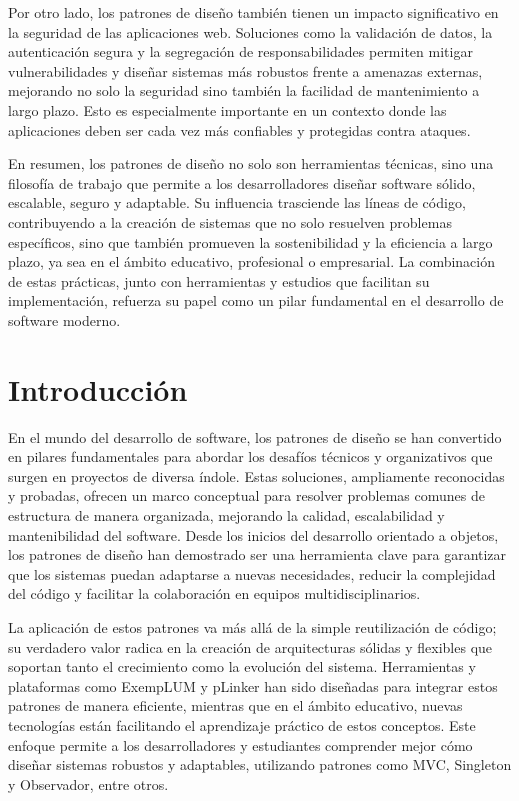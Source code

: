 \documentclass{article}
\begin{document}
Por otro lado, los patrones de diseño también tienen un impacto significativo en la seguridad de las aplicaciones web. Soluciones como la validación de datos, la autenticación segura y la segregación de responsabilidades permiten mitigar vulnerabilidades y diseñar sistemas más robustos frente a amenazas externas, mejorando no solo la seguridad sino también la facilidad de mantenimiento a largo plazo. Esto es especialmente importante en un contexto donde las aplicaciones deben ser cada vez más confiables y protegidas contra ataques.

En resumen, los patrones de diseño no solo son herramientas técnicas, sino una filosofía de trabajo que permite a los desarrolladores diseñar software sólido, escalable, seguro y adaptable. Su influencia trasciende las líneas de código, contribuyendo a la creación de sistemas que no solo resuelven problemas específicos, sino que también promueven la sostenibilidad y la eficiencia a largo plazo, ya sea en el ámbito educativo, profesional o empresarial. La combinación de estas prácticas, junto con herramientas y estudios que facilitan su implementación, refuerza su papel como un pilar fundamental en el desarrollo de software moderno.

\section{Introducción}
En el mundo del desarrollo de software, los patrones de diseño se han convertido en pilares fundamentales para abordar los desafíos técnicos y organizativos que surgen en proyectos de diversa índole. Estas soluciones, ampliamente reconocidas y probadas, ofrecen un marco conceptual para resolver problemas comunes de estructura de manera organizada, mejorando la calidad, escalabilidad y mantenibilidad del software. Desde los inicios del desarrollo orientado a objetos, los patrones de diseño han demostrado ser una herramienta clave para garantizar que los sistemas puedan adaptarse a nuevas necesidades, reducir la complejidad del código y facilitar la colaboración en equipos multidisciplinarios.

La aplicación de estos patrones va más allá de la simple reutilización de código; su verdadero valor radica en la creación de arquitecturas sólidas y flexibles que soportan tanto el crecimiento como la evolución del sistema. Herramientas y plataformas como ExempLUM y pLinker han sido diseñadas para integrar estos patrones de manera eficiente, mientras que en el ámbito educativo, nuevas tecnologías están facilitando el aprendizaje práctico de estos conceptos. Este enfoque permite a los desarrolladores y estudiantes comprender mejor cómo diseñar sistemas robustos y adaptables, utilizando patrones como MVC, Singleton y Observador, entre otros.
\end{document}
